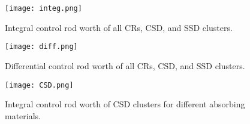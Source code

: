 \begin{figure}
	\centering
	\texttt{[image: integ.png]}
	\vspace{-0.5in}
	\caption{Integral control rod worth of all CRs, CSD, and SSD clusters.} 
	\label{fig:integ}
\end{figure}
\begin{figure}
	\centering
	\texttt{[image: diff.png]}
	\vspace{-0.5in}
	\caption{Differential control rod worth of all CRs, CSD, and SSD clusters.} 
	\label{fig:diff}
\end{figure}
\begin{figure}
	\centering
	\texttt{[image: CSD.png]}
	\vspace{-0.5in}
	\caption{Integral control rod worth of CSD clusters for different absorbing materials.} 
	\label{fig:CSD}
\end{figure}